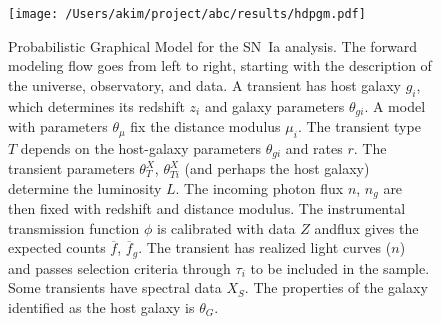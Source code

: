 \documentclass[preprint,3p]{elsarticle}
\begin{document}
\begin{figure}[htbp] %
   \centering
   \texttt{[image: /Users/akim/project/abc/results/hdpgm.pdf]} 
   \caption{Probabilistic Graphical Model for the SN~Ia analysis.  
   The forward modeling
   flow goes from left to right, starting with the description of the universe, observatory,
   and data.    A transient has host galaxy $g_i$, which determines its redshift $z_i$
   and galaxy parameters $\theta_{gi}$.
   A model with parameters $\theta_\mu$ fix the distance modulus $\mu_i$.
   The transient type $T$ depends on the host-galaxy parameters  $\theta_{gi}$
   and rates $r$.   The transient
   parameters $\theta_T^X$, $\theta_{Ti}^X$ (and perhaps the host galaxy) determine the luminosity $L$.       The 
   incoming photon flux $n$, $n_g$  are then fixed
   with redshift and distance modulus.
   The instrumental transmission function $\phi$ is calibrated with data ${Z}$ andflux
   gives the expected
   counts $\overline{f}$, $\overline{f}_g$. 
   The transient has realized light curves ($n$) and passes selection criteria
   through $\tau_i$ to be included in the sample.  Some transients have spectral data
   ${X}_S$.  The properties of the galaxy identified as the host galaxy is $\theta_G$. 
   \label{pgm:fig}}
\end{figure}
\end{document}
